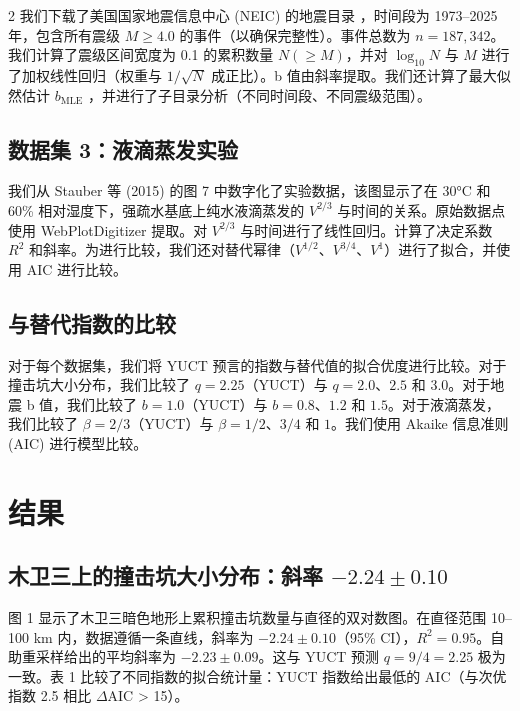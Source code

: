 \documentclass[11pt,a4paper]{article}
\begin{document}
\begin{multicols}{2}
		我们下载了美国国家地震信息中心 (NEIC) 的地震目录 \cite{USGSNEIC}，时间段为 1973–2025 年，包含所有震级 \(M \ge 4.0\) 的事件（以确保完整性）。事件总数为 \(n = 187,342\)。我们计算了震级区间宽度为 0.1 的累积数量 \(N(\ge M)\)，并对 \(\log_{10} N\) 与 \(M\) 进行了加权线性回归（权重与 \(1/\sqrt{N}\) 成正比）。b 值由斜率提取。我们还计算了最大似然估计 \(b_{\text{MLE}}\) \cite{Aki1965}，并进行了子目录分析（不同时间段、不同震级范围）。
		
		\subsection{数据集 3：液滴蒸发实验}
		
		我们从 Stauber 等 (2015) \cite{Stauber2015} 的图 7 中数字化了实验数据，该图显示了在 30°C 和 60\% 相对湿度下，强疏水基底上纯水液滴蒸发的 \(V^{2/3}\) 与时间的关系。原始数据点使用 WebPlotDigitizer \cite{WebPlotDigitizer} 提取。对 \(V^{2/3}\) 与时间进行了线性回归。计算了决定系数 \(R^2\) 和斜率。为进行比较，我们还对替代幂律（\(V^{1/2}\)、\(V^{3/4}\)、\(V^{1}\)）进行了拟合，并使用 AIC 进行比较。
		
		\subsection{与替代指数的比较}
		
		对于每个数据集，我们将 YUCT 预言的指数与替代值的拟合优度进行比较。对于撞击坑大小分布，我们比较了 \(q = 2.25\)（YUCT）与 \(q = 2.0\)、\(2.5\) 和 \(3.0\)。对于地震 b 值，我们比较了 \(b = 1.0\)（YUCT）与 \(b = 0.8\)、\(1.2\) 和 \(1.5\)。对于液滴蒸发，我们比较了 \(\beta = 2/3\)（YUCT）与 \(\beta = 1/2\)、\(3/4\) 和 \(1\)。我们使用 Akaike 信息准则 (AIC) 进行模型比较。
		
		\section{结果}
		
		\subsection{木卫三上的撞击坑大小分布：斜率 \(-2.24 \pm 0.10\)}
		
		图 1 显示了木卫三暗色地形上累积撞击坑数量与直径的双对数图。在直径范围 10–100 km 内，数据遵循一条直线，斜率为 \(-2.24 \pm 0.10\)（95\% CI），\(R^2 = 0.95\)。自助重采样给出的平均斜率为 \(-2.23 \pm 0.09\)。这与 YUCT 预测 \(q = 9/4 = 2.25\) 极为一致。表 1 比较了不同指数的拟合统计量：YUCT 指数给出最低的 AIC（与次优指数 2.5 相比 \(\Delta\)AIC > 15）。
		

\end{multicols}
\end{document}
